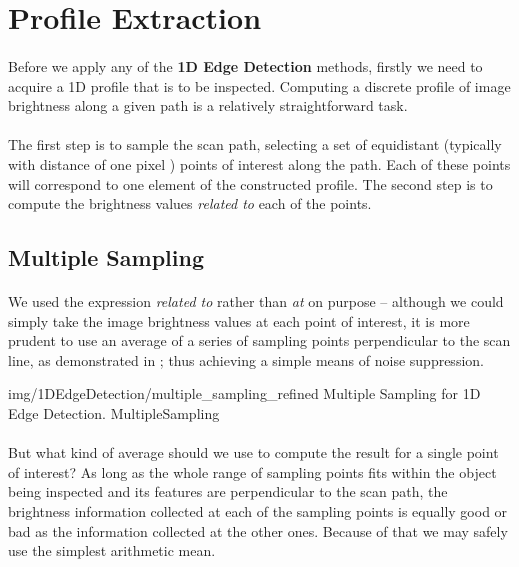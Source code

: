 \section{Profile Extraction}

\paragraph*{}
Before we apply any of the \textbf{1D Edge Detection} methods, firstly we need to acquire a 1D profile that is to be inspected. Computing a discrete profile of image brightness along a given path is a relatively straightforward task.

\paragraph*{}
The first step is to sample the scan path, selecting a set of equidistant (typically with distance of one pixel \cite[p. 150]{MVTec08}) points of interest along the path. Each of these points will correspond to one element of the constructed profile. The second step is to compute the brightness values \textit{related to} each of the points.

\subsection{Multiple Sampling}
\paragraph*{}
We used the expression \textit{related to} rather than \textit{at} on purpose -- although we could simply take the image brightness values at each point of interest, it is more prudent to use an average of a series of sampling points perpendicular to the scan line, as demonstrated in ; thus achieving a simple means of noise suppression. 

\oneFigure
{img/1DEdgeDetection/multiple_sampling_refined}
{Multiple Sampling for 1D Edge Detection.}
{MultipleSampling}
{\basicWidth}

\paragraph*{}
But what kind of average should we use to compute the result for a single point of interest? As long as the whole range of sampling points fits within the object being inspected and its features are perpendicular to the scan path, the brightness information collected at each of the sampling points is equally good or bad as the information collected at the other ones. Because of that we may safely use the simplest arithmetic mean.

